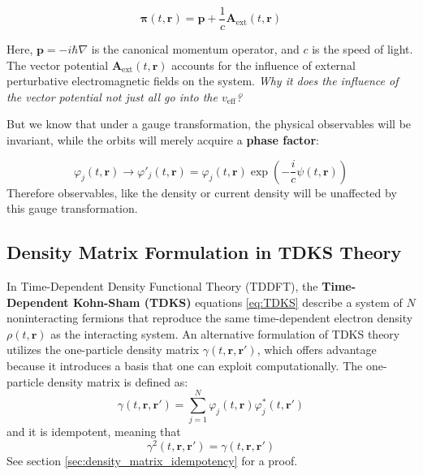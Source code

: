 \documentclass[12pt]{article}
\begin{document}
\begin{equation}
\boldsymbol{\pi}(t, \mathbf{r}) = \mathbf{p} + \frac{1}{c} \mathbf{A}_{\text{ext}}(t, \mathbf{r}) \label{eq:kineticMomentum}
\end{equation}

Here, \( \mathbf{p} = -i\hbar \nabla \) is the canonical momentum operator, and \( c \) is the speed of light. The vector potential \( \mathbf{A}_{\text{ext}}(t, \mathbf{r}) \) accounts for the influence of external perturbative electromagnetic fields on the system. \emph{Why it does the influence of the vector potential not just all go into the $v_{\text{eff}}$?}

But we know that under a gauge transformation, the physical observables will be invariant, while the orbits will merely acquire a \textbf{phase factor}:

\begin{equation}
\varphi_{j}(t, \mathbf{r}) \rightarrow \varphi'_{j}(t, \mathbf{r}) = \varphi_{j}(t, \mathbf{r}) \exp\left(-\frac{i}{c} \psi(t, \mathbf{r})\right) \label{eq:phaseFactor}
\end{equation}
Therefore observables, like the density or current density will be unaffected by this gauge transformation.


\subsection{Density Matrix Formulation in TDKS Theory}

In Time-Dependent Density Functional Theory (TDDFT), the \textbf{Time-Dependent Kohn-Sham (TDKS)} equations \ref{eq:TDKS} describe a system of $N$ noninteracting fermions that reproduce the same time-dependent electron density $\rho(t, \mathbf{r})$ as the interacting system. An alternative formulation of TDKS theory utilizes the one-particle density matrix $\gamma(t, \mathbf{r}, \mathbf{r}')$, which offers advantage because it introduces a basis that one can exploit computationally.
The one-particle density matrix is defined as:
\begin{equation}
\gamma(t, \mathbf{r}, \mathbf{r}') = \sum_{j=1}^{N} \varphi_{j}(t, \mathbf{r}) \varphi_{j}^{*}(t, \mathbf{r}') 
\label{eq:densityMatrix}
\end{equation}
and it is idempotent, meaning that
\begin{equation}
\gamma^{2}(t, \mathbf{r}, \mathbf{r}') = \gamma(t, \mathbf{r}, \mathbf{r}') \end{equation}
See section \ref{sec:density_matrix_idempotency} for a proof.
\end{document}
